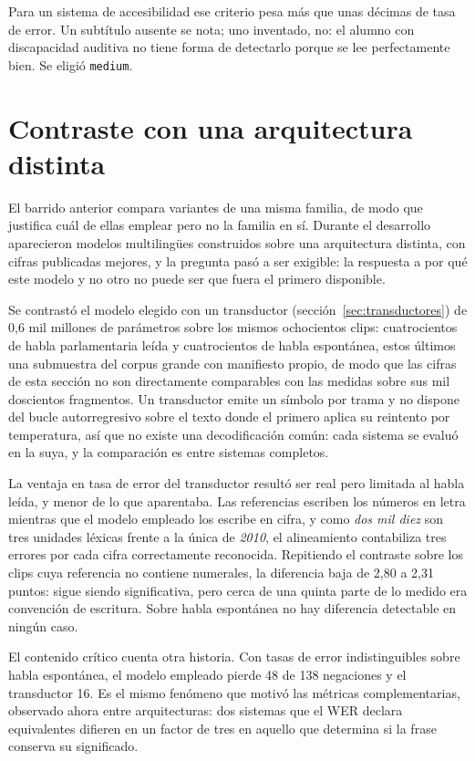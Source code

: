 Para un sistema de accesibilidad ese criterio pesa más que unas décimas de tasa de error.
Un subtítulo ausente se nota; uno inventado, no: el alumno con discapacidad auditiva no
tiene forma de detectarlo porque se lee perfectamente bien. Se eligió \texttt{medium}.

\section{Contraste con una arquitectura distinta}
\label{sec:arquitecturas}

El barrido anterior compara variantes de una misma familia, de modo que justifica cuál de
ellas emplear pero no la familia en sí. Durante el desarrollo aparecieron modelos
multilingües construidos sobre una arquitectura distinta, con cifras publicadas mejores,
y la pregunta pasó a ser exigible: la respuesta a por qué este modelo y no otro no puede
ser que fuera el primero disponible.

Se contrastó el modelo elegido con un transductor (sección~\ref{sec:transductores}) de 0,6 mil millones de parámetros sobre
los mismos ochocientos clips: cuatrocientos de habla parlamentaria leída y cuatrocientos de
habla espontánea, estos últimos una submuestra del corpus grande con manifiesto propio, de
modo que las cifras de esta sección no son directamente comparables con las medidas sobre
sus mil doscientos fragmentos. Un transductor emite un símbolo por trama y no dispone del bucle
autorregresivo sobre el texto donde el primero aplica su reintento por temperatura, así que
no existe una decodificación común: cada sistema se evaluó en la suya, y la comparación es
entre sistemas completos.



La ventaja en tasa de error del transductor resultó ser real pero limitada al habla leída,
y menor de lo que aparentaba. Las referencias escriben los números en letra mientras que el
modelo empleado los escribe en cifra, y como \emph{dos mil diez} son tres unidades léxicas
frente a la única de \emph{2010}, el alineamiento contabiliza tres errores por cada cifra
correctamente reconocida. Repitiendo el contraste sobre los clips cuya referencia no
contiene numerales, la diferencia baja de 2,80 a 2,31 puntos: sigue siendo significativa,
pero cerca de una quinta parte de lo medido era convención de escritura. Sobre habla
espontánea no hay diferencia detectable en ningún caso.

El contenido crítico cuenta otra historia. Con tasas de error indistinguibles sobre habla
espontánea, el modelo empleado pierde 48 de 138 negaciones y el transductor 16. Es el mismo
fenómeno que motivó las métricas complementarias, observado ahora entre arquitecturas: dos
sistemas que el WER declara equivalentes difieren en un factor de tres en aquello que
determina si la frase conserva su significado.


